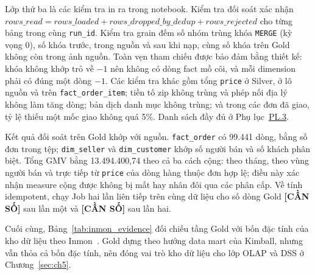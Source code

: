 \documentclass[a4paper]{article}
\begin{document}
Lớp thứ ba là các kiểm tra in ra trong notebook. Kiểm tra đối soát xác nhận $\textit{rows\_read} = \textit{rows\_loaded} + \textit{rows\_dropped\_by\_dedup} + \textit{rows\_rejected}$ cho từng bảng trong cùng \texttt{run\_id}. Kiểm tra grain đếm số nhóm trùng khóa \texttt{MERGE} (kỳ vọng 0), số khóa trước, trong nguồn và sau khi nạp, cùng số khóa trên Gold không còn trong ảnh nguồn. Toàn vẹn tham chiếu được bảo đảm bằng thiết kế: khóa không khớp trỏ về $-1$ nên không có dòng fact mồ côi, và mỗi dimension phải có đúng một dòng $-1$. Các kiểm tra khác gồm tổng \texttt{price} ở Silver, ở lô nguồn và trên \texttt{fact\_order\_item}; tiền tố zip không trùng và phép nối địa lý không làm tăng dòng; bản dịch danh mục không trùng; và trong các đơn đã giao, tỷ lệ thiếu một mốc giao không quá 5\%. Danh sách đầy đủ ở Phụ lục~\hyperref[pl:3]{PL.3}.

Kết quả đối soát trên Gold khớp với nguồn. \texttt{fact\_order} có 99.441 dòng, bằng số đơn trong tệp; \texttt{dim\_seller} và \texttt{dim\_customer} khớp số người bán và số khách phân biệt. Tổng GMV bằng 13.494.400,74 theo cả ba cách cộng: theo tháng, theo vùng người bán và trực tiếp từ \texttt{price} của dòng hàng thuộc đơn hợp lệ; điều này xác nhận measure cộng được không bị mất hay nhân đôi qua các phân cấp. Về tính idempotent, chạy Job hai lần liên tiếp trên cùng dữ liệu cho số dòng Gold \textbf{[CẦN SỐ]} sau lần một và \textbf{[CẦN SỐ]} sau lần hai.

Cuối cùng, Bảng~\ref{tab:inmon_evidence} đối chiếu tầng Gold với bốn đặc tính của kho dữ liệu theo Inmon~\cite{bib:inmon2005}. Gold dựng theo hướng data mart của Kimball, nhưng vẫn thỏa cả bốn đặc tính, nên đóng vai trò kho dữ liệu cho lớp OLAP và DSS ở Chương~\ref{sec:ch5}.
\end{document}
